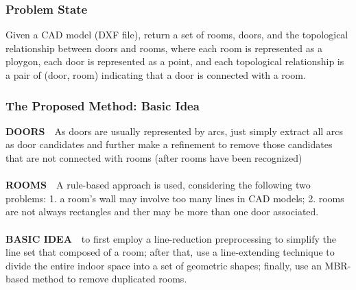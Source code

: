 
\begin{frame}
\frametitle{Problem State}

\begin{problem}
  Given a CAD model (DXF file), return a set of rooms, doors, and the topological relationship between doors and rooms, where each room is represented as a ploygon, each door is represented as a point, and each topological relationship is a pair of (door, room) indicating that a door is connected with a room.
\end{problem}

\end{frame}


\begin{frame}
\frametitle{The Proposed Method: Basic Idea}

\textbf{DOORS}~~As doors are usually represented by arcs, just simply extract all arcs as door candidates and further make a refinement to remove those candidates that are not connected with rooms (after rooms have been recognized)\\~\\

\textbf{ROOMS}~~A rule-based approach is used, considering the following two problems: 1. a room's wall may involve too many lines in CAD models; 2. rooms are not always rectangles and ther may be more than one door associated.\\~\\

\textbf{BASIC IDEA}~~to first employ a line-reduction preprocessing to simplify the line set that composed of a room; after that, use a line-extending technique to divide the entire indoor space into a set of geometric shapes; finally, use an MBR-based method to remove duplicated rooms.

\end{frame}


